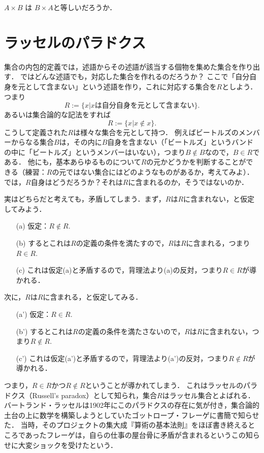 \documentclass[11pt,a4paper]{jsarticle}
\begin{document}
\begin{renshu}{}{}
$A \times B$ は $B \times A$と等しいだろうか．
\end{renshu}{}{} 

%


\section{ラッセルのパラドクス}
集合の内包的定義では，述語からその述語が該当する個物を集めた集合を作り出す．
ではどんな述語でも，対応した集合を作れるのだろうか？
ここで「自分自身を元として含まない」という述語を作り，これに対応する集合を$R$としよう．
つまり
\[
 R := \{x | x \text{は自分自身を元として含まない}\}.
\]
あるいは集合論的な記法をすれば
\[
 R := \{x | x \not \in x\}.
\]
こうして定義された$R$は様々な集合を元として持つ．
例えばビートルズのメンバーからなる集合$B$は，その内に$B$自身を含まない（「ビートルズ」というバンドの中に「ビートルズ」というメンバーはいない），つまり$B \not \in B$なので，$B \in R$である．
他にも，基本あらゆるものについて$R$の元かどうかを判断することができる（練習：$R$の元ではない集合にはどのようなものがあるか，考えてみよ）．
では，$R$自身はどうだろうか？それは$R$に含まれるのか，そうではないのか．

実はどちらだと考えても，矛盾してしまう．まず，$R$は$R$に含まれない，と仮定してみよう．
\begin{itemize}
 \item[(a)] 仮定：$R \not\in R$.
 \item[(b)] するとこれは$R$の定義の条件を満たすので，$R$は$R$に含まれる，つまり$R \in R$.
 \item[(c)] これは仮定(a)と矛盾するので，背理法より(a)の反対，つまり$R \in R$が導かれる．
\end{itemize}
次に，$R$は$R$に含まれる，と仮定してみる．
\begin{itemize}
 \item[(a')] 仮定：$R \in R$.
 \item[(b')] するとこれは$R$の定義の条件を満たさないので，$R$は$R$に含まれない，つまり$R \not\in R$.
 \item[(c')] これは仮定(a')と矛盾するので，背理法より(a')の反対，つまり$R \not\in R$が導かれる．
\end{itemize}
つまり，$R \in R$かつ$R \not\in R$ということが導かれてしまう．
これはラッセルのパラドクス（Russell's paradox）として知られ，集合$R$はラッセル集合とよばれる．
バートランド・ラッセルは1902年にこのパラドクスの存在に気が付き，集合論的土台の上に数学を構築しようとしていたゴットロープ・フレーゲに書簡で知らせた．
当時，そのプロジェクトの集大成『算術の基本法則』をほぼ書き終えるところであったフレーゲは，自らの仕事の屋台骨に矛盾が含まれるというこの知らせに大変ショックを受けたという．
\end{document}
